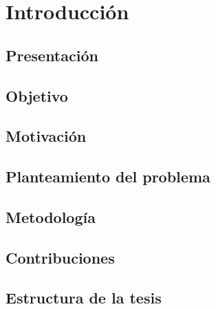 
\chapter{Introducción}



\section{Presentación} 
\section{Objetivo}

\section{Motivación}

\section{Planteamiento del problema}

\section{Metodología}

\section{Contribuciones}


\section{Estructura de la tesis}
